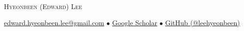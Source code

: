 \documentclass[a4paper,10pt]{extarticle}
\begin{document}
\renewcommand*{\arraystretch}{1.5}

\pagestyle{empty}

\begin{center}
	{\huge \textsc{Hyeonbeen (Edward) Lee}}
\end{center}

\vspace*{-0.38cm}
{\small
	\begin{center}
		\href{mailto:edward.hyeonbeen.lee@gmail.com}{edward.hyeonbeen.lee@gmail.com} $\bullet$ \href{https://scholar.google.com/citations?user=TiduRxoAAAAJ}{Google Scholar} $\bullet$ \href{https://github.com/leehyeonbeen}{GitHub (@leehyeonbeen)}
	\end{center}}
\vspace*{-0.4cm}



\end{document}
